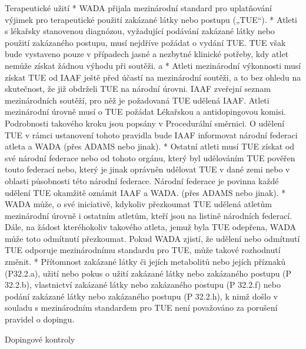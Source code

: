 Terapeutické užití
* WADA přijala mezinárodní standard pro uplatňování výjimek pro terapeutické použití zakázané látky nebo postupu („TUE“).
* Atleti s lékařsky stanovenou diagnózou, vyžadující podávání zakázané látky nebo použití zakázaného postupu, musí nejdříve požádat o vydání TUE. TUE však bude vystaveno pouze v případech jasné a nezbytné klinické potřeby, kdy atlet nemůže získat žádnou výhodu při soutěži.
  \begitems \style a
  * Atleti mezinárodní výkonnosti musí získat TUE od IAAF ještě před účastí na mezinárodní soutěži, a to bez ohledu na skutečnost, že již obdrželi TUE na národní úrovni. IAAF zveřejní seznam mezinárodních soutěží, pro něž je požadovaná TUE udělená IAAF. Atleti mezinárodní úrovně musí o TUE požádat Lékařskou a antidopingovou komisi. Podrobnosti takového kroku jsou popsány v Procedurální směrnici. O udělení TUE v rámci ustanovení tohoto pravidla bude IAAF informovat  národní federaci atleta a WADA (přes ADAMS nebo jinak).
  * Ostatní atleti musí TUE získat od své národní federace nebo od tohoto orgánu, který byl udělováním TUE pověřen touto federací nebo, který je jinak oprávněn udělovat TUE v dané zemi nebo v oblasti působnosti této národní federace. Národní federace je povinna každé udělení TUE okamžitě oznámit IAAF a WADA. (přes ADAMS nebo jinak).
  * WADA může, o své iniciativě, kdykoliv přezkoumat TUE udělená atletům mezinárodní úrovně i ostatním atletům, kteří jsou na listině národních federací. Dále, na žádost kteréhokoliv takového atleta, jemuž byla TUE odepřena, WADA může toto odmítnutí přezkoumat. Pokud WADA zjistí, že udělení nebo odmítnutí TUE odporuje mezinárodnímu standardu pro TUE, může takové rozhodnutí změnit.
  * Přítomnost zakázané látky či jejích metabolitů nebo jejích příznaků (P32.2.a), užití nebo pokus o užití zakázané látky nebo zakázaného postupu (P 32.2.b), vlastnictví zakázané látky nebo zakázaného postupu (P 32.2.f) nebo podání zakázané látky nebo zakázaného postupu (P 32.2.h), k nimž došlo v souladu s mezinárodním standardem pro TUE není považováno za porušení pravidel o dopingu.
  \enditems
\enditems

\secc Dopingové kontroly


